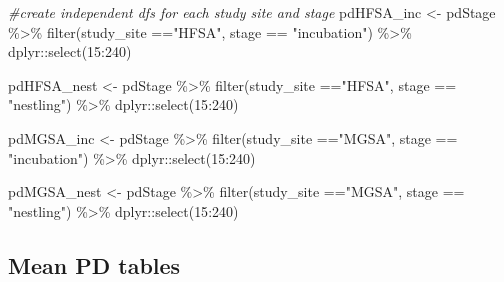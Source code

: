 \documentclass[
]{article}
\newenvironment{Shaded}{\begin{snugshade}}{\end{snugshade}}
\newcommand{\CommentTok}[1]{\textcolor[rgb]{0.56,0.35,0.01}{\textit{#1}}}
\newcommand{\FunctionTok}[1]{\textcolor[rgb]{0.00,0.00,0.00}{#1}}
\newcommand{\NormalTok}[1]{#1}
\newcommand{\OtherTok}[1]{\textcolor[rgb]{0.56,0.35,0.01}{#1}}
\newcommand{\SpecialCharTok}[1]{\textcolor[rgb]{0.00,0.00,0.00}{#1}}
\newcommand{\StringTok}[1]{\textcolor[rgb]{0.31,0.60,0.02}{#1}}
\begin{document}
\begin{Shaded}
\begin{Highlighting}[]
\CommentTok{\#create independent dfs for each study site and stage}
\NormalTok{pdHFSA\_inc }\OtherTok{\textless{}{-}}\NormalTok{ pdStage }\SpecialCharTok{\%\textgreater{}\%}
  \FunctionTok{filter}\NormalTok{(study\_site }\SpecialCharTok{==}\StringTok{"HFSA"}\NormalTok{, stage }\SpecialCharTok{==} \StringTok{"incubation"}\NormalTok{) }\SpecialCharTok{\%\textgreater{}\%}
\NormalTok{  dplyr}\SpecialCharTok{::}\FunctionTok{select}\NormalTok{(}\StringTok{\textquotesingle{}15\textquotesingle{}}\SpecialCharTok{:}\StringTok{\textquotesingle{}240\textquotesingle{}}\NormalTok{)}

\NormalTok{pdHFSA\_nest }\OtherTok{\textless{}{-}}\NormalTok{ pdStage }\SpecialCharTok{\%\textgreater{}\%} 
  \FunctionTok{filter}\NormalTok{(study\_site }\SpecialCharTok{==}\StringTok{"HFSA"}\NormalTok{, stage }\SpecialCharTok{==} \StringTok{"nestling"}\NormalTok{) }\SpecialCharTok{\%\textgreater{}\%}
\NormalTok{  dplyr}\SpecialCharTok{::}\FunctionTok{select}\NormalTok{(}\StringTok{\textquotesingle{}15\textquotesingle{}}\SpecialCharTok{:}\StringTok{\textquotesingle{}240\textquotesingle{}}\NormalTok{)}

\NormalTok{pdMGSA\_inc }\OtherTok{\textless{}{-}}\NormalTok{ pdStage }\SpecialCharTok{\%\textgreater{}\%}
  \FunctionTok{filter}\NormalTok{(study\_site }\SpecialCharTok{==}\StringTok{"MGSA"}\NormalTok{, stage }\SpecialCharTok{==} \StringTok{"incubation"}\NormalTok{) }\SpecialCharTok{\%\textgreater{}\%}
\NormalTok{  dplyr}\SpecialCharTok{::}\FunctionTok{select}\NormalTok{(}\StringTok{\textquotesingle{}15\textquotesingle{}}\SpecialCharTok{:}\StringTok{\textquotesingle{}240\textquotesingle{}}\NormalTok{)}
         
\NormalTok{pdMGSA\_nest }\OtherTok{\textless{}{-}}\NormalTok{ pdStage }\SpecialCharTok{\%\textgreater{}\%}
  \FunctionTok{filter}\NormalTok{(study\_site }\SpecialCharTok{==}\StringTok{"MGSA"}\NormalTok{, stage }\SpecialCharTok{==} \StringTok{"nestling"}\NormalTok{) }\SpecialCharTok{\%\textgreater{}\%}
\NormalTok{  dplyr}\SpecialCharTok{::}\FunctionTok{select}\NormalTok{(}\StringTok{\textquotesingle{}15\textquotesingle{}}\SpecialCharTok{:}\StringTok{\textquotesingle{}240\textquotesingle{}}\NormalTok{)}
\end{Highlighting}
\end{Shaded}

\hypertarget{mean-pd-tables-1}{%
\subsection{Mean PD tables}\label{mean-pd-tables-1}}
\end{document}
